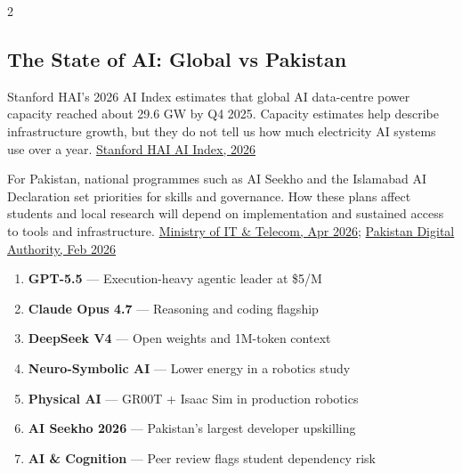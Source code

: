 \documentclass[10pt, a4paper]{article}
\newcommand{\ruled}{%
  \par\vspace{0.3em}%
  \noindent{\color{electric}\rule{\linewidth}{0.4pt}}\par
  \vspace{0.3em}}
\begin{document}
\begin{multicols}{2}

\subsection{The State of AI: Global vs Pakistan}

{\small
Stanford HAI's 2026 AI Index estimates that global AI data-centre power capacity reached about 29.6 GW by Q4 2025. Capacity estimates help describe infrastructure growth, but they do not tell us how much electricity AI systems use over a year.
\href{https://hai.stanford.edu/assets/files/ai_index_report_2026_chapter_1_research_development.pdf}{Stanford HAI AI Index, 2026}

For Pakistan, national programmes such as AI Seekho and the Islamabad AI Declaration set priorities for skills and governance. How these plans affect students and local research will depend on implementation and sustained access to tools and infrastructure.
\href{https://www.moitt.gov.pk/NewsDetail/NjRhZWNhZGQtZGRkNC00MmJiLTk5YjctNmU0MTA0MjZhYTFi}{Ministry of IT \& Telecom, Apr 2026};
\href{https://www.pda.gov.pk/press-details.php?id=islamabad-ai-declaration}{Pakistan Digital Authority, Feb 2026}
}

\begin{statbox}[title={\faChartBar\quad 7 Macro-Trends This Fortnight}]
  {\small
  \begin{enumerate}[itemsep=2pt, leftmargin=*]
    \item \textbf{GPT-5.5} --- Execution-heavy agentic leader at \$5/M
    \item \textbf{Claude Opus 4.7} --- Reasoning and coding flagship
    \item \textbf{DeepSeek V4} --- Open weights and 1M-token context
    \item \textbf{Neuro-Symbolic AI} --- Lower energy in a robotics study
    \item \textbf{Physical AI} --- GR00T + Isaac Sim in production robotics
    \item \textbf{AI Seekho 2026} --- Pakistan's largest developer upskilling
    \item \textbf{AI \& Cognition} --- Peer review flags student dependency risk
  \end{enumerate}
  }
\end{statbox}

\ruled


\end{multicols}
\end{document}

